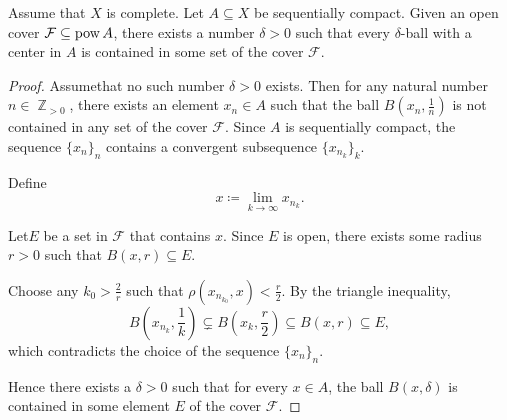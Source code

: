 \begin{lemma}\label{thm:lebesgues_covering_lemma}
  Assume that \( X \) is complete. Let \( A \subseteq X \) be sequentially compact. Given an open cover \( \mathcal{F} \subseteq \operatorname{pow} A \), there exists a number \( \delta > 0 \) such that every \( \delta \)-ball with a center in \( A \) is contained in some set of the cover \( \mathcal{F} \).
\end{lemma}
\begin{proof}
  Assume\LEM that no such number \( \delta > 0 \) exists. Then for any natural number \( n \in \BbbZ_{>0} \), there exists an element \( x_n \in A \) such that the ball \( B(x_n, \frac 1 n) \) is not contained in any set of the cover \( \mathcal{F} \). Since \( A \) is sequentially compact, the sequence \( \{ x_n \}_n \) contains a convergent subsequence \( \{ x_{n_k} \}_k \).

  Define
  \begin{equation*}
    x \coloneqq \lim_{k \to \infty} x_{n_k}.
  \end{equation*}

  Let\AOC \( E \) be a set in \( \mathcal{F} \) that contains \( x \). Since \( E \) is open, there exists some radius \( r > 0 \) such that \( B(x, r) \subseteq E \).

  Choose any \( k_0 > \frac 2 r \) such that \( \rho(x_{n_{k_0}}, x) < \frac r 2 \). By the triangle inequality,
  \begin{equation*}
    B \left(x_{n_k}, \frac 1 k \right) \subsetneq B \left(x_k, \frac r 2 \right) \subseteq B(x, r) \subseteq E,
  \end{equation*}
  which contradicts the choice of the sequence \( \{ x_n \}_n \).

  Hence there exists a \( \delta > 0 \) such that for every \( x \in A \), the ball \( B(x, \delta) \) is contained in some element \( E \) of the cover \( \mathcal{F} \).
\end{proof}

